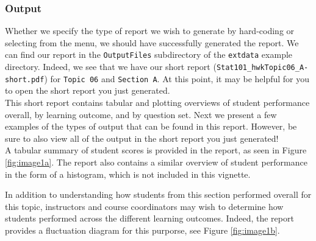 \documentclass{article}\usepackage[]{graphicx}\usepackage[]{color}
\numberwithin{equation}{section} %
\begin{document}
\subsubsection{Output}

Whether we specify the type of report we wish to generate by hard-coding or selecting from the menu, we should have successfully generated the report. We can find our report in the \texttt{OutputFiles} subdirectory of the \texttt{extdata} example directory. Indeed, we see that we have our short report (\texttt{Stat101\_hwkTopic06\_A-short.pdf}) for \texttt{Topic 06} and \texttt{Section A}. At this point, it may be helpful for you to open the short report you just generated. \\

This short report contains tabular and plotting overviews of student performance overall, by learning outcome, and by question set. Next we present a few examples of the types of output that can be found in this report. However, be sure to also view all of the output in the short report you just generated! \\

A tabular summary of student scores is provided in the report, as seen in Figure \ref{fig:image1a}. The report also contains a similar overview of student performance in the form of a histogram, which is not included in this vignette.

\begin{center}
\captionsetup{width=0.65\textwidth}
\label{fig:image1a}
\end{center}

In addition to understanding how students from this section performed overall for this topic, instructors and course coordinators may wish to determine how students performed across the different learning outcomes. Indeed, the report provides a fluctuation diagram for this purporse, see Figure \ref{fig:image1b}.
\end{document}
